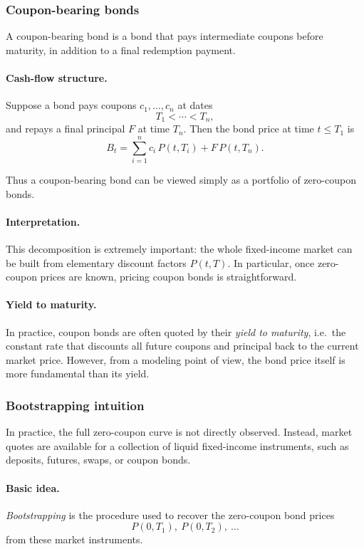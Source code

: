 \documentclass[11pt]{article}
\theoremstyle{plain}
\theoremstyle{definition}
\theoremstyle{remark}
\begin{document}
\subsubsection{Coupon-bearing bonds}

A coupon-bearing bond is a bond that pays intermediate coupons before
maturity, in addition to a final redemption payment.

\paragraph{Cash-flow structure.}
Suppose a bond pays coupons \(c_1,\dots,c_n\) at dates
\[
T_1<\cdots<T_n,
\]
and repays a final principal \(F\) at time \(T_n\).
Then the bond price at time \(t\le T_1\) is
\[
B_t
=
\sum_{i=1}^n c_i\,P(t,T_i)+F\,P(t,T_n).
\]

Thus a coupon-bearing bond can be viewed simply as a portfolio of
zero-coupon bonds.

\paragraph{Interpretation.}
This decomposition is extremely important:
the whole fixed-income market can be built from elementary discount
factors \(P(t,T)\).
In particular, once zero-coupon prices are known, pricing coupon bonds
is straightforward.

\paragraph{Yield to maturity.}
In practice, coupon bonds are often quoted by their
\emph{yield to maturity}, i.e.\ the constant rate that discounts all
future coupons and principal back to the current market price.
However, from a modeling point of view, the bond price itself is more
fundamental than its yield.

\subsubsection{Bootstrapping intuition}

In practice, the full zero-coupon curve is not directly observed.
Instead, market quotes are available for a collection of liquid
fixed-income instruments, such as deposits, futures, swaps, or coupon
bonds.

\paragraph{Basic idea.}
\emph{Bootstrapping} is the procedure used to recover the zero-coupon
bond prices
\[
P(0,T_1),\ P(0,T_2),\ \dots
\]
from these market instruments.
\end{document}
